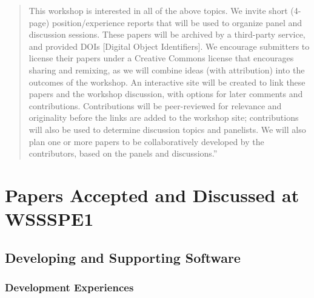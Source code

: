 \documentclass[11pt, oneside]{amsart}
\begin{document}
\begin{quote}
This workshop is interested in all of the above topics.  We invite
short (4-page) position/experience reports that will be used to
organize panel and discussion sessions. These papers will be archived
by a third-party service, and provided DOIs [Digital Object
  Identifiers].  We encourage submitters to license their papers under
a Creative Commons license that encourages sharing and remixing, as we
will combine ideas (with attribution) into the outcomes of the
workshop.  An interactive site will be created to link these papers
and the workshop discussion, with options for later comments and
contributions. Contributions will be peer-reviewed for relevance and
originality before the links are added to the workshop site;
contributions will also be used to determine discussion topics and
panelists. We will also plan one or more papers to be collaboratively
developed by the contributors, based on the panels and discussions.''
\end{quote}

\newpage

\section{Papers Accepted and Discussed at WSSSPE1} \label{sec:papers}

\subsection*{Developing and Supporting Software}

\subsubsection*{Development Experiences}
\end{document}
